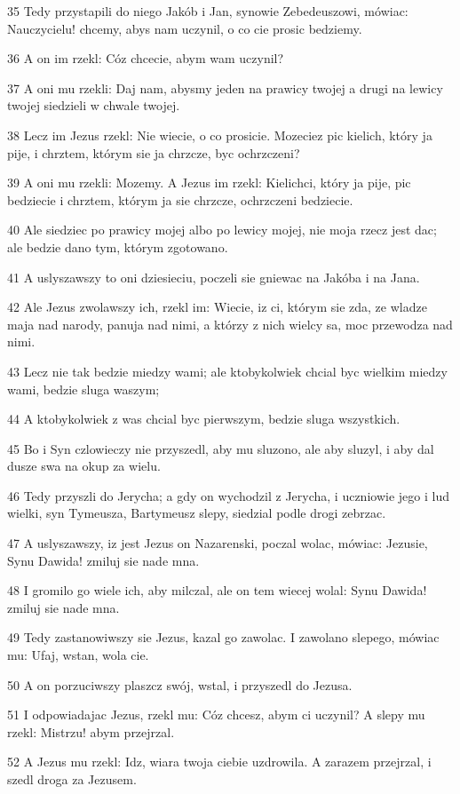 \par 35 Tedy przystapili do niego Jakób i Jan, synowie Zebedeuszowi, mówiac: Nauczycielu! chcemy, abys nam uczynil, o co cie prosic bedziemy.
\par 36 A on im rzekl: Cóz chcecie, abym wam uczynil?
\par 37 A oni mu rzekli: Daj nam, abysmy jeden na prawicy twojej a drugi na lewicy twojej siedzieli w chwale twojej.
\par 38 Lecz im Jezus rzekl: Nie wiecie, o co prosicie. Mozeciez pic kielich, który ja pije, i chrztem, którym sie ja chrzcze, byc ochrzczeni?
\par 39 A oni mu rzekli: Mozemy. A Jezus im rzekl: Kielichci, który ja pije, pic bedziecie i chrztem, którym ja sie chrzcze, ochrzczeni bedziecie.
\par 40 Ale siedziec po prawicy mojej albo po lewicy mojej, nie moja rzecz jest dac; ale bedzie dano tym, którym zgotowano.
\par 41 A uslyszawszy to oni dziesieciu, poczeli sie gniewac na Jakóba i na Jana.
\par 42 Ale Jezus zwolawszy ich, rzekl im: Wiecie, iz ci, którym sie zda, ze wladze maja nad narody, panuja nad nimi, a którzy z nich wielcy sa, moc przewodza nad nimi.
\par 43 Lecz nie tak bedzie miedzy wami; ale ktobykolwiek chcial byc wielkim miedzy wami, bedzie sluga waszym;
\par 44 A ktobykolwiek z was chcial byc pierwszym, bedzie sluga wszystkich.
\par 45 Bo i Syn czlowieczy nie przyszedl, aby mu sluzono, ale aby sluzyl, i aby dal dusze swa na okup za wielu.
\par 46 Tedy przyszli do Jerycha; a gdy on wychodzil z Jerycha, i uczniowie jego i lud wielki, syn Tymeusza, Bartymeusz slepy, siedzial podle drogi zebrzac.
\par 47 A uslyszawszy, iz jest Jezus on Nazarenski, poczal wolac, mówiac: Jezusie, Synu Dawida! zmiluj sie nade mna.
\par 48 I gromilo go wiele ich, aby milczal, ale on tem wiecej wolal: Synu Dawida! zmiluj sie nade mna.
\par 49 Tedy zastanowiwszy sie Jezus, kazal go zawolac. I zawolano slepego, mówiac mu: Ufaj, wstan, wola cie.
\par 50 A on porzuciwszy plaszcz swój, wstal, i przyszedl do Jezusa.
\par 51 I odpowiadajac Jezus, rzekl mu: Cóz chcesz, abym ci uczynil? A slepy mu rzekl: Mistrzu! abym przejrzal.
\par 52 A Jezus mu rzekl: Idz, wiara twoja ciebie uzdrowila. A zarazem przejrzal, i szedl droga za Jezusem.

